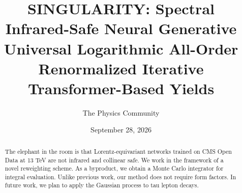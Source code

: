 \documentclass[11pt]{article}
\title{SINGULARITY: Spectral Infrared-Safe Neural Generative Universal Logarithmic All-Order Renormalized Iterative Transformer-Based Yields}
\author{The Physics Community}
\date{September 28, 2026}
\numberwithin{equation}{section}
\theoremstyle{definition}
\theoremstyle{remark}
\begin{document}
\maketitle
\begin{abstract}
The elephant in the room is that Lorentz-equivariant networks trained on
CMS Open Data at 13 TeV are not infrared and collinear safe. We work in
the framework of a novel reweighting scheme. As a byproduct, we obtain a
Monte Carlo integrator for integral evaluation. Unlike previous work,
our method does not require form factors. In future work, we plan to
apply the Gaussian process to tau lepton decays.
\end{abstract}
\tableofcontents



\nocite{*}


\end{document}

